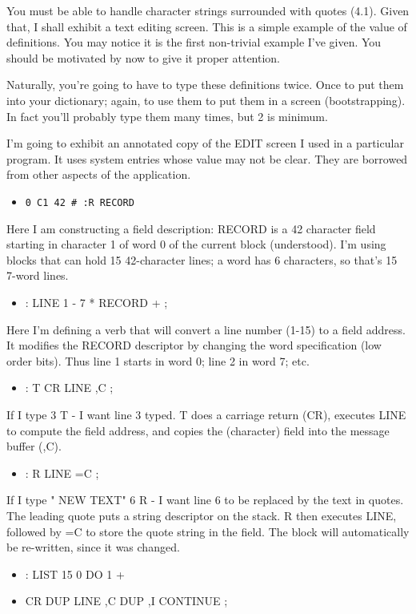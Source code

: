\documentclass[b5paper, oneside]{book}
\begin{document}
You must be able to handle character strings surrounded with quotes (4.1). Given that, I shall exhibit a text editing screen. This is a simple example of the value of definitions. You may notice it is the first non-trivial example I've given. You should be motivated by now to give it proper attention.

Naturally, you're going to have to type these definitions twice. Once to put them into your dictionary; again, to use them to put them in a screen (bootstrapping). In fact you'll probably type them many times, but 2 is minimum.

I'm going to exhibit an annotated copy of the EDIT screen I used in a particular program. It uses system entries whose value may not be clear. They are borrowed from other aspects of the application.\begin{itemize}
   \item \verb|0 C1 42 # :R RECORD|\end{itemize}
Here I am constructing a field description: RECORD is a 42 character field starting in character 1 of word 0 of the current block (understood). I'm using blocks that can hold 15 42-character lines; a word has 6 characters, so that's 15 7-word lines.\begin{itemize}
   \item : LINE 1 - 7 * RECORD + ;\end{itemize}
Here I'm defining a verb that will convert a line number (1-15) to a field address. It modifies the RECORD descriptor by changing the word specification (low order bits). Thus line 1 starts in word 0; line 2 in word 7; etc.\begin{itemize}
   \item : T CR LINE ,C ; \end{itemize}
If I type 3 T - I want line 3 typed. T does a carriage return (CR), executes LINE to compute the field address, and copies the (character) field into the message buffer (,C).\begin{itemize}
   \item : R LINE =C ;\end{itemize}
If I type " NEW TEXT" 6 R - I want line 6 to be replaced by the text in quotes. The leading quote puts a string descriptor on the stack. R then executes LINE, followed by =C to store the quote string in the field. The block will automatically be re-written, since it was changed.\begin{itemize}
   \item : LIST 15 0 DO 1 +
   \item CR DUP LINE ,C DUP ,I CONTINUE ;\end{itemize}
\end{document}
